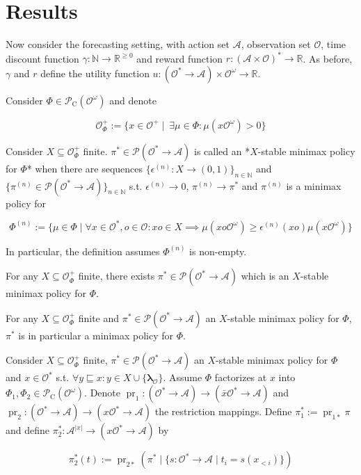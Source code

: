 \documentclass[a4paper]{article}
\DeclareMathOperator{\Prj}{pr}
\newcommand{\Nats}{\mathbb{N}}
\newcommand{\Reals}{\mathbb{R}}
\newcommand{\Estr}{\boldsymbol{\lambda}}
\newcommand{\Abs}[1]{\lvert #1 \rvert}
\newcommand{\Prob}{\mathcal{P}}
\newcommand{\Act}{\mathcal{A}}
\newcommand{\Obs}{\mathcal{O}}
\newcommand{\His}{(\Act \times \Obs)^*}
\newcommand{\Pol}{\Obs^* \rightarrow \Act}
\newcommand{\Env}{\Obs^\omega}
\newcommand{\MixPol}{\Prob(\Pol)}
\newcommand{\PC}{\Prob_{\operatorname{C}}}
\newcommand{\Mod}{\PC(\Env)}
\newcommand{\Adm}{\Obs_\Phi^+}
\begin{document}
\section{Results}

Now consider the forecasting setting, with action set $\Act$, observation set $\Obs$, time discount function $\gamma: \Nats \rightarrow \Reals^{\geq 0}$ and reward function $r: \His \rightarrow \Reals$. As before, $\gamma$ and $r$ define the utility function $u: (\Pol) \times \Env \rightarrow \Reals$.

Consider $\Phi \in \Mod$ and denote

$$\Adm:=\{x \in \Obs^+ \mid \ \exists \mu \in \Phi: \mu(x\Env) > 0\}$$


Consider $X \subseteq \Adm$ finite. $\pi^* \in \MixPol$ is called an *$X$-stable minimax policy for $\Phi$* when there are sequences $\{\epsilon^{(n)}: X \rightarrow (0,1)\}_{n \in \Nats}$ and $\{\pi^{(n)} \in \MixPol\}_{n \in \Nats}$ s.t. $\epsilon^{(n)} \rightarrow 0$, $\pi^{(n)} \rightarrow \pi^*$ and $\pi^{(n)}$ is a minimax policy for

$$\Phi^{(n)}:=\{\mu \in \Phi \mid \forall x \in \Obs^*, o \in \Obs: xo \in X \implies \mu(xo\Env) \geq \epsilon^{(n)}(xo) \mu(x\Env)\}$$

In particular, the definition assumes $\Phi^{(n)}$ is non-empty.


For any $X \subseteq \Adm$ finite, there exists $\pi^* \in \MixPol$ which is an $X$-stable minimax policy for $\Phi$.


For any $X \subseteq \Adm$ finite and $\pi^* \in \MixPol$ an $X$-stable minimax policy for $\Phi$, ${\pi^*}$ is in particular a minimax policy for $\Phi$.


Consider $X \subseteq \Adm$ finite, $\pi^* \in \MixPol$ an $X$-stable minimax policy for $\Phi$ and ${x \in \Obs^*}$ s.t. ${\forall y \sqsubseteq x : y \in X \cup \{\Estr_\Obs\}}$. Assume ${\Phi}$ factorizes at ${x}$ into ${\Phi_1,\Phi_2 \in \Mod}$. Denote ${\Prj_1: (\Pol) \rightarrow (\bar{x}\Obs^* \rightarrow \Act)}$ and ${\Prj_2: (\Pol) \rightarrow (x\Obs^* \rightarrow \Act)}$ the restriction mappings. Define ${\pi_1^* := \Prj_{1*} \pi}$ and define ${\pi_2^*: \Act^{\Abs{x}} \rightarrow (x\Obs^* \rightarrow \Act)}$ by

$$\pi_2^*(t):=\Prj_{2*}(\pi^* \mid \{s: \Pol \mid t_i=s(x_{<i})\})$$
\end{document}
